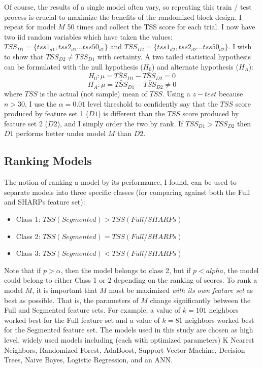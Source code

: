 \documentclass[defaultstyle,11pt]{thesis}
\begin{document}
Of course, the results of a single model often vary, so repeating this train / test process is crucial to maximize the benefits of the randomized block design. I repeat for model $M$ 50 times and collect the TSS score for each trial. I now have two iid random variables which have taken the values: $TSS_{D1} = \{tss1_{d1}, tss2_{d1}... tss50_{d1}\}$ and $TSS_{D2} = \{tss1_{d2}, tss2_{d2}... tss50_{d2}\}$. I wish to show that $\bar{TSS}_{D2} \neq \bar{TSS}_{D1}$ with certainty. A two tailed statistical hypothesis can be formulated with the null hypothesis ($H_0$) and alternate hypothesis ($H_A$):
$$H_0: \mu = \bar{TSS}_{D1} - \bar{TSS}_{D2} = 0$$
$$H_A: \mu = \bar{TSS}_{D1} - \bar{TSS}_{D2} \neq 0$$
where $\bar{TSS}$ is the actual (not sample) mean of $TSS$. Using a $z-test$ because $n > 30$, I use the $\alpha = 0.01$ level threshold to confidently say that the $TSS$ score produced by feature set 1 ($D1$) is different than the $TSS$ score produced by feature set 2 ($D2$), and I simply order the two by rank. If $TSS_{D1} > TSS_{D2}$ then $D1$ performs better under model $M$ than $D2$. 

\subsection{Ranking Models}

The notion of ranking a model by its performance, I found, can be used to separate models into three specific classes (for comparing against both the Full and SHARPs feature set):

\begin{itemize}
    \item Class 1: $TSS(Segmented) > TSS(Full / SHARPs)$
    \item Class 2: $TSS(Segmented) = TSS(Full / SHARPs)$
    \item Class 3: $TSS(Segmented) < TSS(Full / SHARPs)$
\end{itemize}

Note that if $p > \alpha$, then the model belongs to class 2, but if $p < alpha$, the model could belong to either Class 1 or 2 depending on the ranking of scores. To rank a model $M$, it is important that $M$ must be maximized \textit{with its own feature set} as best as possible. That is, the parameters of $M$ change significantly between the Full and Segmented feature sets. For example, a value of $k = 101$ neighbors worked best for the Full feature set and a value of $k = 81$ neighbors worked best for the Segmented feature set. The models used in this study are chosen as high level, widely used models including (each with optimized parameters) K Nearest Neighbors, Randomized Forest, AdaBoost, Support Vector Machine, Decision Trees, Naive Bayes, Logistic Regression, and an ANN. 
\end{document}
